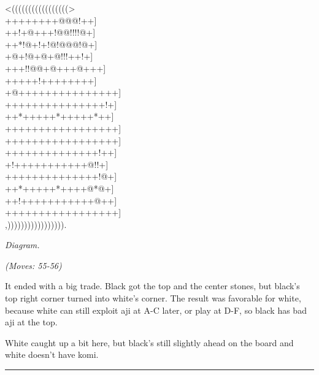 \documentclass[letterpaper,12pt]{memoir}
\newcounter{GoFigure}[part]
\newcommand{\gofigure}{%
 \stepcounter{GoFigure}
 \centerline{\textit{Diagram.\thinspace\arabic{GoFigure}}}
}
\newcommand{\subtext}[1]{\centerline{\textit{#1}}}
\begin{document}
\begin{minipage}[t]{240pt}
\label{Fujisawa-Hosai-vs-Go-Seigen-19430225:mainmove-55}
{\gnos
<(((((((((((((((((>\\
++++++++@@@!++]\\
++!+@+++!@@!!!!@+]\\
++*!@+!+!@!@@@!@+]\\
+@+!@+@+@!!!++!+]\\
+++!!@@+@+++@+++]\\
+++++!++++++++]\\
+@+++++++++++++++]\\
+++++++++++++++!+]\\
++*+++++*+++++*++]\\
+++++++++++++++++]\\
+++++++++++++++++]\\
++++++++++++++!++]\\
+!+++++++++++@!!+]\\
++++++++++++++!@+]\\
++*+++++*++++@*@+]\\
++!+++++++++++@++]\\
+++++++++++++++++]\\
,))))))))))))))))).\\
}
\gofigure
\subtext{(Moves: 55-56)}
\end{minipage}
\begin{minipage}[t]{268.19999999999993pt}
\setlength{\parskip}{0.5em}
It ended with a big trade. Black got the top and the center stones, but black's top right corner turned into white's corner. The result was favorable for white, because white can still exploit aji at A-C later, or play at D-F, so black has bad aji at the top.

White caught up a bit here, but black's still slightly ahead on the board and white doesn't have komi.


\end{minipage}
\vfill

\rule{\textwidth}{0.5pt}
\end{document}
